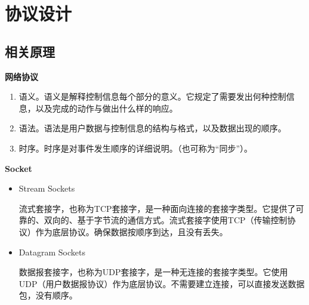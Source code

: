 \documentclass[12pt]{article}
\begin{document}
\section{协议设计}
\subsection{相关原理}

\textbf{网络协议}
\begin{enumerate}
    \item  语义。语义是解释控制信息每个部分的意义。它规定了需要发出何种控制信息，以及完成的动作与做出什么样的响应。
    \item 语法。语法是用户数据与控制信息的结构与格式，以及数据出现的顺序。
    \item 时序。时序是对事件发生顺序的详细说明。（也可称为“同步”）。
\end{enumerate}

\textbf{Socket}
\begin{itemize}
    \item Stream Sockets

    流式套接字，也称为TCP套接字，是一种面向连接的套接字类型。它提供了可靠的、双向的、基于字节流的通信方式。流式套接字使用TCP（传输控制协议）作为底层协议。确保数据按顺序到达，且没有丢失。

    \item Datagram Sockets

    数据报套接字，也称为UDP套接字，是一种无连接的套接字类型。它使用UDP（用户数据报协议）作为底层协议。不需要建立连接，可以直接发送数据包，没有顺序。
\end{itemize}
\end{document}
